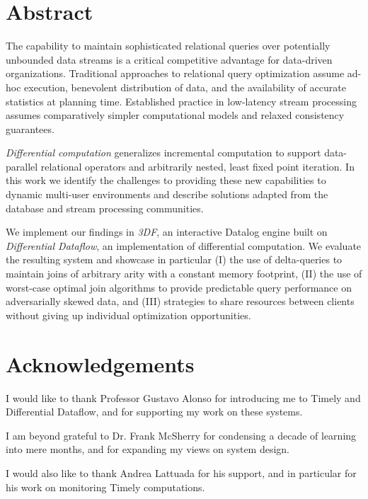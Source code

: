 \documentclass{article}
\begin{document}
\tableofcontents

\newpage

\section{Abstract} \label{abstract}

The capability to maintain sophisticated relational queries over
potentially unbounded data streams is a critical competitive advantage
for data-driven organizations. Traditional approaches to relational
query optimization assume ad-hoc execution, benevolent distribution of
data, and the availability of accurate statistics at planning
time. Established practice in low-latency stream processing assumes
comparatively simpler computational models and relaxed consistency
guarantees.

\emph{Differential computation} generalizes incremental computation to
support data-parallel relational operators and arbitrarily nested,
least fixed point iteration. In this work we identify the challenges
to providing these new capabilities to dynamic multi-user environments
and describe solutions adapted from the database and stream processing
communities.

We implement our findings in \emph{3DF}, an interactive Datalog engine
built on \emph{Differential Dataflow}, an implementation of
differential computation. We evaluate the resulting system and
showcase in particular (I) the use of delta-queries to maintain joins
of arbitrary arity with a constant memory footprint, (II) the use of
worst-case optimal join algorithms to provide predictable query
performance on adversarially skewed data, and (III) strategies to
share resources between clients without giving up individual
optimization opportunities.

\newpage

\section*{Acknowledgements}

I would like to thank Professor Gustavo Alonso for introducing me to
Timely and Differential Dataflow, and for supporting my work on these
systems.

I am beyond grateful to Dr. Frank McSherry for condensing a decade of
learning into mere months, and for expanding my views on system
design.

I would also like to thank Andrea Lattuada for his support, and in
particular for his work on monitoring Timely computations.
\end{document}
